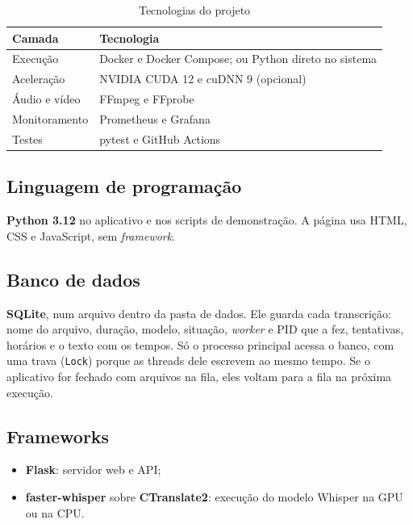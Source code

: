 \documentclass[12pt,a4paper]{article}
\begin{document}
\begin{table}[H]
\centering
\begin{tabularx}{\textwidth}{@{}lX@{}}
\toprule
\textbf{Camada} & \textbf{Tecnologia} \\
\midrule
Execução & Docker e Docker Compose; ou Python direto no sistema \\
Aceleração & NVIDIA CUDA 12 e cuDNN 9 (opcional) \\
Áudio e vídeo & FFmpeg e FFprobe \\
Monitoramento & Prometheus e Grafana \\
Testes & pytest e GitHub Actions \\
\bottomrule
\end{tabularx}
\caption{Tecnologias do projeto}
\end{table}

\subsection{Linguagem de programação}
\textbf{Python 3.12} no aplicativo e nos scripts de demonstração. A página usa HTML, CSS e
JavaScript, sem \emph{framework}.

\subsection{Banco de dados}
\textbf{SQLite}, num arquivo dentro da pasta de dados. Ele guarda cada transcrição: nome do
arquivo, duração, modelo, situação, \emph{worker} e PID que a fez, tentativas, horários e o
texto com os tempos. Só o processo principal acessa o banco, com uma trava (\texttt{Lock})
porque as threads dele escrevem ao mesmo tempo. Se o aplicativo for fechado com arquivos na
fila, eles voltam para a fila na próxima execução.

\subsection{Frameworks}
\begin{itemize}
  \item \textbf{Flask}: servidor web e API;
  \item \textbf{faster-whisper} sobre \textbf{CTranslate2}: execução do modelo Whisper na GPU ou na CPU.
\end{itemize}
\end{document}
